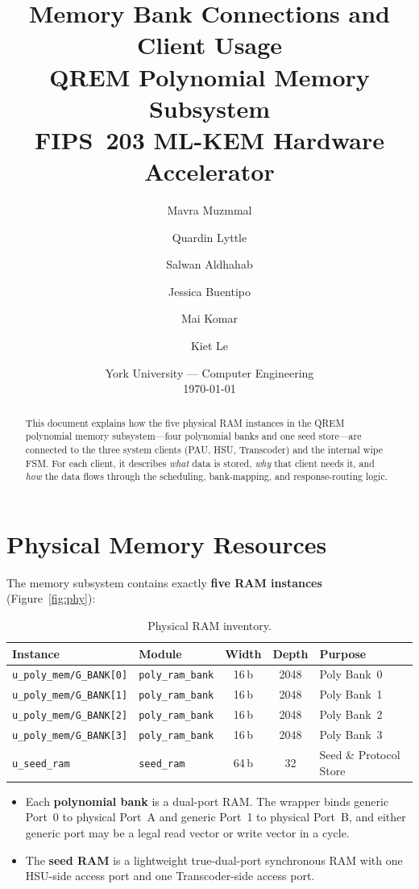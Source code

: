 \documentclass[11pt,letterpaper]{article}
\title{%
  \textbf{Memory Bank Connections and Client Usage}\\[0.4em]
  \large QREM Polynomial Memory Subsystem\\[0.4em]
  \normalsize FIPS~203 ML-KEM Hardware Accelerator
}
\author{
  Mavra Muzmmal \and Quardin Lyttle \and Salwan Aldhahab \and
  Jessica Buentipo \and Mai Komar \and Kiet Le
}
\date{York University — Computer Engineering\\[0.3em]\today}
\begin{document}
\maketitle
\thispagestyle{fancy}

\begin{abstract}
This document explains how the five physical RAM instances in the QREM
polynomial memory subsystem---four polynomial banks and one seed
store---are connected to the three system clients (PAU, HSU, Transcoder)
and the internal wipe FSM. For each client, it describes \emph{what}
data is stored, \emph{why} that client needs it, and \emph{how} the
data flows through the scheduling, bank-mapping, and response-routing
logic.
\end{abstract}

\tableofcontents
\newpage

\section{Physical Memory Resources}
\label{sec:resources}

The memory subsystem contains exactly \textbf{five RAM instances}
(Figure~\ref{fig:phy}):

\begin{table}[H]
\centering
\caption{Physical RAM inventory.}
\label{tab:rams}
\begin{tabular}{@{}llccl@{}}
\toprule
\textbf{Instance} & \textbf{Module} & \textbf{Width} & \textbf{Depth} &
\textbf{Purpose} \\
\midrule
\texttt{u\_poly\_mem/G\_BANK[0]} & \texttt{poly\_ram\_bank} & 16\,b & 2048 & Poly Bank~0 \\
\texttt{u\_poly\_mem/G\_BANK[1]} & \texttt{poly\_ram\_bank} & 16\,b & 2048 & Poly Bank~1 \\
\texttt{u\_poly\_mem/G\_BANK[2]} & \texttt{poly\_ram\_bank} & 16\,b & 2048 & Poly Bank~2 \\
\texttt{u\_poly\_mem/G\_BANK[3]} & \texttt{poly\_ram\_bank} & 16\,b & 2048 & Poly Bank~3 \\
\texttt{u\_seed\_ram}             & \texttt{seed\_ram}      & 64\,b & 32   & Seed \& Protocol Store \\
\bottomrule
\end{tabular}
\end{table}

\begin{itemize}
  \item Each \textbf{polynomial bank} is a dual-port RAM. The wrapper binds
    generic Port~0 to physical Port~A and generic Port~1 to physical Port~B,
    and either generic port may be a legal read vector or write vector in a
    cycle.
  \item The \textbf{seed RAM} is a lightweight true-dual-port synchronous
    RAM with one HSU-side access port and one Transcoder-side access port.
\end{itemize}
\end{document}
